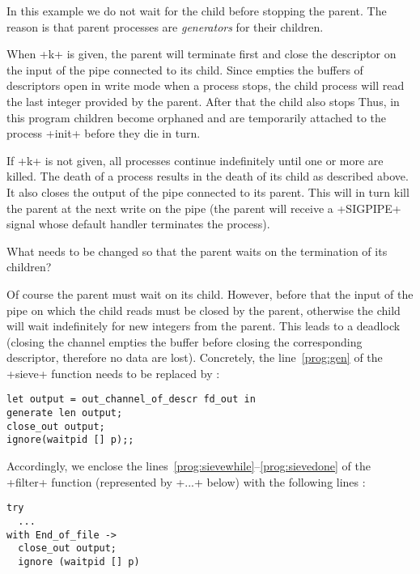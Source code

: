In this example we do not wait for the child before stopping the
parent. The reason is that parent processes are \emph{generators} for
their children.

When \ml+k+ is given, the parent will terminate first and close
the descriptor on the input of the pipe connected to its child. Since
{\ocaml} empties the buffers of descriptors open in write mode when a
process stops, the child process will read the last integer provided
by the parent. After that the child also stops {\etc} Thus, in this
program children become orphaned and are temporarily attached to the
process \ml+init+ before they die in turn.

If \ml+k+ is not given, all processes continue indefinitely until one or
more are killed. The death of a process results in the death of its child
as described above. It also closes the output of the pipe connected to
its parent. This will in turn kill the parent at the next write on the
pipe (the parent will receive a \ml+SIGPIPE+ signal whose default
handler terminates the process).

\begin{exercise}
What needs to be changed so that the parent waits on the termination
of its children?
\end{exercise}
\begin{answer}
Of course the parent must wait on its child. However, before that the
input of the pipe on which the child reads must be closed by the
parent, otherwise the child will wait indefinitely for new integers from the
parent. This leads to a deadlock (closing the channel empties the
buffer before closing the corresponding descriptor, therefore no data
are lost).  Concretely, the line~\ref{prog:gen} of the \ml+sieve+
function needs to be replaced by :
\begin{lstlisting}
let output = out_channel_of_descr fd_out in
generate len output;
close_out output;
ignore(waitpid [] p);;
\end{lstlisting}
Accordingly, we enclose the 
lines~\ref{prog:sievewhile}--\ref{prog:sievedone} of the 
\ml+filter+ function (represented by \ml+...+ below) with the
following lines :
\begin{lstlisting}
try 
  ...
with End_of_file -> 
  close_out output;
  ignore (waitpid [] p)
\end{lstlisting}
\end{answer}

